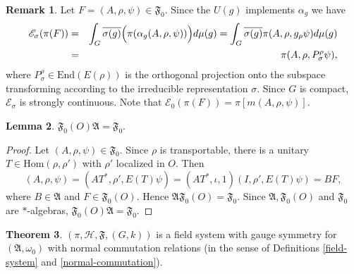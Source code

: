 \documentclass[12pt]{article}
\newcommand{\alg}[1]{\mathfrak{#1}}
\theoremstyle{definition}
\newtheorem{thm}{Theorem}[section]
\newtheorem{lemma}[thm]{Lemma}
\theoremstyle{definition}
\newtheorem{note}[thm]{Remark}
\theoremstyle{remark}
\def\2#1{{\mathcal #1}}
\def\4#1{{\mathscr #1}}
\def\a{\alpha} \def\b{\beta} \def\g{\gamma} \def\d{\delta}
\def\om{\omega} \def\Om{\Omega} \def\dd{\partial} \def\D{\Delta}
\newcommand{\Hom}{\mathrm{Hom}}
\newcommand{\End}{\mathrm{End}}
\newcommand{\fields}{(\pi ,\2H ,\alg{F},(G,k))}
\begin{document}
\begin{note} Let $F=(A,\rho ,\psi )\in \alg{F}_0$.  Since the $U(g)$ implements $\a
  _g$ we have
  \begin{eqnarray} \4E _{\sigma}(\pi (F)) &=& \int _{G} \overline{\sigma (g)}\Bigl(
    \pi (\a _g(A, \rho ,\psi ))\Bigr)d\mu (g) = \int _G \overline{\sigma (g)}\pi
    (A,\rho ,g_\rho \psi )d\mu (g) \nonumber \\ &=& \pi (A,\rho
    ,P^{\rho}_{\sigma}\psi ) ,\label{eqn-projection} \end{eqnarray} where
  $P_{\sigma}^{\rho}\in \End (E(\rho ))$ is the orthogonal projection onto the
  subspace transforming according to the irreducible representation $\sigma$.  Since
  $G$ is compact, $\4E _\sigma$ is strongly continuous. Note that $\4E _{0}(\pi
  (F))=\pi [m(A,\rho ,\psi )]$. \end{note}

\begin{lemma} $\alg{F}_0(O)\alg{A}=\alg{F}_0$. \label{cyclic} \end{lemma}

  \begin{proof} Let $(A,\rho ,\psi )\in \alg{F}_0$.  Since $\rho$ is transportable,
    there is a unitary $T\in \Hom (\rho ,\rho ')$ with $\rho '$ localized in $O$.
    Then
$$ (A,\rho ,\psi )=(AT^*,\rho ',E(T)\psi )=(AT^*,\iota ,1)(I,\rho ',E(T)\psi )=BF ,$$
where $B\in \alg{A}$ and $F\in \alg{F}_0(O)$. Hence $\alg{A}\alg{F}_0(O)=\alg{F}_0$.
Since $\alg{A},\alg{F}_0(O)$ and $\alg{F}_0$ are $*$-algebras,
$\alg{F}_0(O)\alg{A}=\alg{F}_0$.  \end{proof}


\begin{thm} $\fields$ is a field system with gauge
  symmetry for $(\alg{A},\om _0)$ with normal
  commutation relations (in the sense of Definitions
  \ref{field-system} and
  \ref{normal-commutation}). \end{thm}
\end{document}
